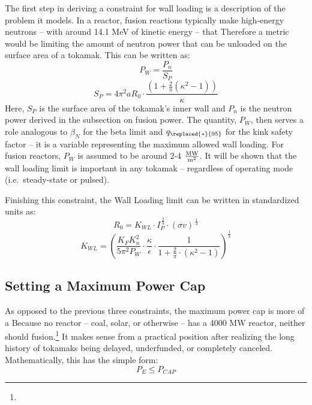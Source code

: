 The first step in deriving a  constraint for wall loading is a description of the problem it models. In a reactor, fusion reactions typically make high-energy neutrons -- with around 14.1 MeV of kinetic energy -- that  Therefore a  metric would be limiting the amount of neutron power that can be unloaded on the surface area of a tokamak. This can be written as:\cite{minervini}
\begin{equation}
	P_W = \frac{ P_n }{ S_P }
\end{equation}
\begin{equation}
	S_P = 4 \pi^2 a R_0 \cdot \frac{ \left( 1 + \frac{2}{\pi} \left( \kappa^2 -1 \right) \right) }{ \kappa }
\end{equation}
Here, $S_P$ is the surface area of the tokamak's inner wall and $P_n$ is the neutron power derived in the subsection on fusion power. The quantity, $P_W$, then serves a role analogous to $\beta_N$ for the beta limit and $q_{\replaced{*}{95}}$ for the kink safety factor -- it is a  variable representing the maximum allowed wall loading. For fusion reactors, $P_W$ is assumed to be around 2-4 $\frac{\textnormal{MW}}{\textnormal{m}^2}$. It will be shown that the wall loading limit is important in any tokamak -- regardless of operating mode (i.e.\ steady-state or pulsed).

Finishing this  constraint, the Wall Loading limit can be written in standardized units as:
\begin{equation}
	\label{eq:r_wall}
	R_0 = K_{WL} \cdot I_P^{ \, \frac{2}{3} } \cdot (\sigma v) ^{ \, \frac{1}{3} }
\end{equation}
\begin{equation}
	K_{WL} = \left( \frac{ K_F K_n^2 }{ 5 \pi^2 P_W } \cdot \frac{\kappa}{\epsilon} \cdot \frac{1}{1 + \frac{2}{\pi} \cdot ( \kappa^2 - 1 ) } \right) ^ { \frac{1}{3} }
\end{equation}

\subsection{Setting a Maximum Power Cap}

As opposed to the previous three  constraints, the maximum power cap is more of a  Because no reactor -- coal, solar, or otherwise -- has a 4000 MW reactor, neither should fusion.\footnote{} It makes sense from a practical position after realizing the long history of tokamaks being delayed, underfunded, or completely canceled. Mathematically, this has the simple form:
\begin{equation}
	P_E \le P_{CAP}
\end{equation}

